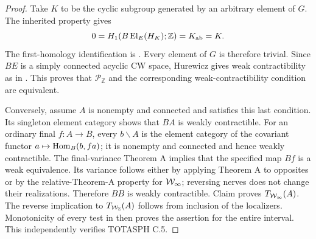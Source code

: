 \begin{proof}
Take $K$ to be the cyclic subgroup generated by an arbitrary element of $G$. The inherited property gives
\[
 0=H_1(B\operatorname{El}_E(H_K);\mathbb Z)=K_{\mathrm{ab}}=K.
\]
The first-homology identification is \citet[Theorem 2A.1]{RootHatcher2002}. Every element of $G$ is therefore trivial. Since $BE$ is a simply connected acyclic CW space, Hurewicz gives weak contractibility as in . This proves that $\mathcal P_{\mathbb Z}$ and the corresponding weak-contractibility condition are equivalent.

Conversely, assume $A$ is nonempty and connected and satisfies this last condition. Its singleton element category shows that $BA$ is weakly contractible. For an ordinary final $f:A\to B$, every $b\backslash A$ is the element category of the covariant functor $a\mapsto\operatorname{Hom}_B(b,fa)$; it is nonempty and connected and hence weakly contractible. The final-variance Theorem A implies that the specified map $Bf$ is a weak equivalence. Its variance follows either by applying Theorem A to opposites or by the relative-Theorem-A property for $\mathcal{W}_{\infty}$; reversing nerves does not change their realizations. Therefore $BB$ is weakly contractible. Claim  proves $T_{\mathcal{W}_{\infty}}(A)$. The reverse implication to $T_{\mathcal{W}_{\mathbb Z}}(A)$ follows from inclusion of the localizers. Monotonicity of every test in  then proves the assertion for the entire interval. This independently verifies TOTASPH C.5.
\end{proof}

